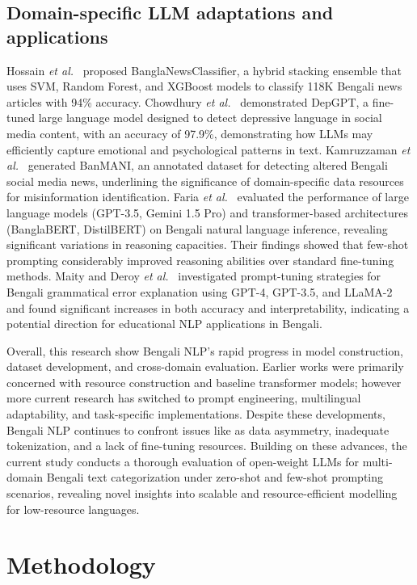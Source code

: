 \documentclass[10pt,letterpaper]{article}
\begin{document}
\subsection*{Domain-specific LLM adaptations and applications}

Hossain \textit{et al.}~\cite{b26} proposed BanglaNewsClassifier, a hybrid stacking ensemble that uses SVM, Random Forest, and XGBoost models to classify 118K Bengali news articles with 94\% accuracy. Chowdhury \textit{et al.}~\cite{b27} demonstrated DepGPT, a fine-tuned large language model designed to detect depressive language in social media content, with an accuracy of 97.9\%, demonstrating how LLMs may efficiently capture emotional and psychological patterns in text. Kamruzzaman \textit{et al.}~\cite{b28} generated BanMANI, an annotated dataset for detecting altered Bengali social media news, underlining the significance of domain-specific data resources for misinformation identification. Faria \textit{et al.}~\cite{b29} evaluated the performance of large language models (GPT-3.5, Gemini 1.5 Pro) and transformer-based architectures (BanglaBERT, DistilBERT) on Bengali natural language inference, revealing significant variations in reasoning capacities. Their findings showed that few-shot prompting considerably improved reasoning abilities over standard fine-tuning methods. Maity and Deroy \textit{et al.}~\cite{b30} investigated prompt-tuning strategies for Bengali grammatical error explanation using GPT-4, GPT-3.5, and LLaMA-2 and found significant increases in both accuracy and interpretability, indicating a potential direction for educational NLP applications in Bengali.

\noindent Overall, this research show Bengali NLP's rapid progress in model construction, dataset development, and cross-domain evaluation. Earlier works were primarily concerned with resource construction and baseline transformer models; however more current research has switched to prompt engineering, multilingual adaptability, and task-specific implementations. Despite these developments, Bengali NLP continues to confront issues like as data asymmetry, inadequate tokenization, and a lack of fine-tuning resources. Building on these advances, the current study conducts a thorough evaluation of open-weight LLMs for multi-domain Bengali text categorization under zero-shot and few-shot prompting scenarios, revealing novel insights into scalable and resource-efficient modelling for low-resource languages.

\section*{Methodology}
\label{sec:methodology}
\end{document}
